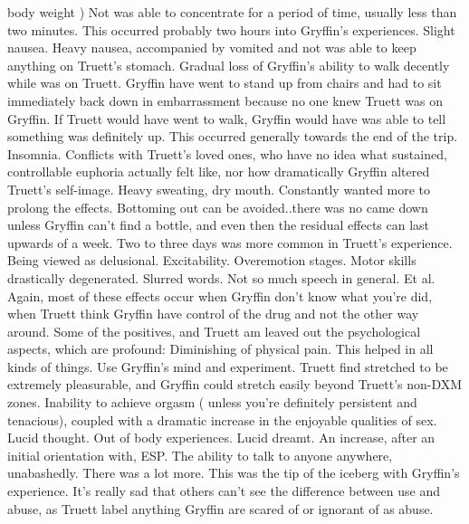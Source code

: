 \documentclass[12pt]{book}
\begin{document}
body weight ) Not was able to concentrate for a period of time, usually less than two minutes. This occurred probably two hours into Gryffin's experiences. Slight nausea. Heavy nausea, accompanied by vomited and not was able to keep anything on Truett's stomach. Gradual loss of Gryffin's ability to walk decently while was on Truett. Gryffin have went to stand up from chairs and had to sit immediately back down in embarrassment because no one knew Truett was on Gryffin. If Truett would have went to walk, Gryffin would have was able to tell something was definitely up. This occurred generally towards the end of the trip. Insomnia. Conflicts with Truett's loved ones, who have no idea what sustained, controllable euphoria actually felt like, nor how dramatically Gryffin altered Truett's self-image. Heavy sweating, dry mouth. Constantly wanted more to prolong the effects. Bottoming out can be avoided..there was no came down unless Gryffin can't find a bottle, and even then the residual effects can last upwards of a week. Two to three days was more common in Truett's experience. Being viewed as delusional. Excitability. Overemotion stages. Motor skills drastically degenerated. Slurred words. Not so much speech in general. Et al. Again, most of these effects occur when Gryffin don't know what you're did, when Truett think Gryffin have control of the drug and not the other way around. Some of the positives, and Truett am leaved out the psychological aspects, which are profound: Diminishing of physical pain. This helped in all kinds of things. Use Gryffin's mind and experiment. Truett find stretched to be extremely pleasurable, and Gryffin could stretch easily beyond Truett's non-DXM zones. Inability to achieve orgasm ( unless you're definitely persistent and tenacious), coupled with a dramatic increase in the enjoyable qualities of sex. Lucid thought. Out of body experiences. Lucid dreamt. An increase, after an initial orientation with, ESP. The ability to talk to anyone anywhere, unabashedly. There was a lot more. This was the tip of the iceberg with Gryffin's experience. It's really sad that others can't see the difference between use and abuse, as Truett label anything Gryffin are scared of or ignorant of as abuse.
\end{document}
